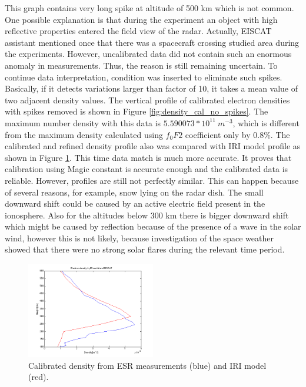 \documentclass{article}
\begin{document}
This graph contains very long spike at altitude of 500 km which is not common. One possible explanation is that during the experiment an object with high reflective properties entered the field view of the radar. Actually, EISCAT assistant mentioned once that there was a spacecraft crossing studied area during the experiments. However, uncalibrated data did not contain such an enormous anomaly in measurements. Thus, the reason is still remaining uncertain. To continue data interpretation, condition was inserted to eliminate such spikes. Basically, if it detects variations larger than factor of 10, it takes a mean value of two adjacent density values. The vertical profile of calibrated electron densities with spikes removed is shown in Figure \ref{fig:density_cal_no_spikes}. The maximum number density with this data is $5.590073*10^{11}\:m^{-3}$, which is different from the maximum density calculated using $f_0F2$ coefficient only by 0.8\%. The calibrated and refined density profile also was compared with IRI model profile as shown in Figure \ref{fig:iri_eiscat}. This time data match is much more accurate. It proves that calibration using Magic constant is accurate enough and the calibrated data is reliable. However, profiles are still not perfectly similar. This can happen because of several reasons, for example, snow lying on the radar dish. The small downward shift could be caused by an active electric field present in the ionosphere. \cite{Stoffregen:1969ed} Also for the altitudes below 300 km there is bigger downward shift which might be caused by reflection because of the presence of a wave in the solar wind, however this is not likely, because investigation of the space weather showed that there were no strong solar flares during the relevant time period.
\begin{figure}[h!tb]
	\centering
	\includegraphics[width=0.5\textwidth]{Figures/iri_eiscat.png}
	\caption{Calibrated density from ESR measurements (blue) and IRI model (red).}
	\label{fig:iri_eiscat}
\end{figure}
\end{document}
